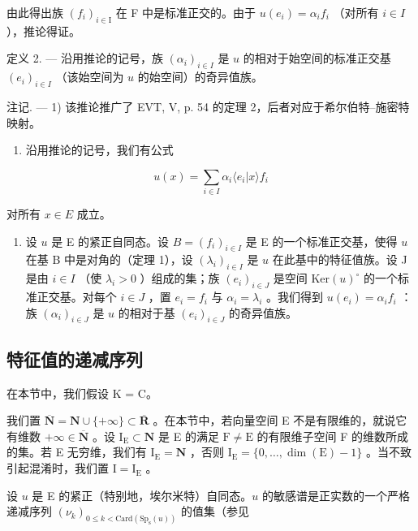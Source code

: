由此得出族 \((f_{i})_{i\in\mathrm{I}}\) 在 F 中是标准正交的。由于 \(u(e_{i})=\alpha_{i}f_{i}\) （对所有 \(i\in I\) ），推论得证。

定义 2. --- 沿用推论的记号，族 \((\alpha_{i})_{i\in I}\) 是 \(u\) 的相对于始空间的标准正交基 \((e_{i})_{i\in I}\) （该始空间为 \(u\) 的始空间）的奇异值族。

注记. --- 1) 该推论推广了 EVT, V, p. 54 的定理 2，后者对应于希尔伯特–施密特映射。

\begin{enumerate}
\def\labelenumi{\arabic{enumi})}
\setcounter{enumi}{1}
\tightlist
\item
  沿用推论的记号，我们有公式
\end{enumerate}

\[
u (x) = \sum_ {i \in I} \alpha_ {i} \langle e _ {i} | x \rangle f _ {i}\tag{1}
\]

对所有 \(x \in E\) 成立。

\begin{enumerate}
\def\labelenumi{\arabic{enumi})}
\setcounter{enumi}{2}
\tightlist
\item
  设 \(u\) 是 E 的紧正自同态。设 \(B = (f_i)_{i \in I}\) 是 E 的一个标准正交基，使得 \(u\) 在基 B 中是对角的（定理 1），设 \((\lambda_i)_{i \in I}\) 是 \(u\) 在此基中的特征值族。设 J 是由 \(i \in I\) （使 \(\lambda_i > 0\) ）组成的集；族 \((e_i)_{i \in J}\) 是空间 \(\text{Ker}(u)^{\circ}\) 的一个标准正交基。对每个 \(i \in J\) ，置 \(e_i = f_i\) 与 \(\alpha_i = \lambda_i\) 。我们得到 \(u(e_i) = \alpha_if_i\) ：族 \((\alpha_i)_{i \in J}\) 是 \(u\) 的相对于基 \((e_i)_{i \in J}\) 的奇异值族。
\end{enumerate}

\subsection{特征值的递减序列}

在本节中，我们假设 K = C。

我们置 \(\overline{\mathbf{N}} = \mathbf{N} \cup \{+\infty\} \subset \overline{\mathbf{R}}\) 。在本节中，若向量空间 E 不是有限维的，就说它有维数 \(+\infty \in \overline{\mathbf{N}}\) 。设 \(\mathrm{I_E} \subset \mathbf{N}\) 是 E 的满足 \(\mathrm{F} \neq \mathrm{E}\) 的有限维子空间 F 的维数所成的集。若 E 无穷维，我们有 \(\mathrm{I_E} = \mathbf{N}\) ，否则 \(\mathrm{I_E} = \{0, \ldots, \dim(\mathrm{E}) - 1\}\) 。当不致引起混淆时，我们置 \(\mathrm{I} = \mathrm{I_E}\) 。

设 \(u\) 是 E 的紧正（特别地，埃尔米特）自同态。\(u\) 的敏感谱是正实数的一个严格递减序列 \((\nu_{k})_{0\leqslant k<\mathrm{Card}(\mathrm{Sp}_{\mathrm{s}}(u))}\) 的值集（参见

